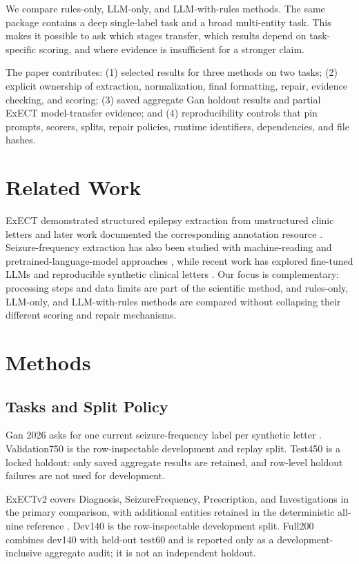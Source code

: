 \documentclass[conference]{IEEEtran}
\begin{document}
We compare rules-only, LLM-only, and LLM-with-rules methods. The same package
contains a deep single-label task and a broad
multi-entity task. This makes it possible to ask which stages transfer, which
results depend on task-specific scoring, and where evidence is insufficient for
a stronger claim.

The paper contributes: (1) selected results for three methods on two tasks;
(2) explicit ownership of extraction, normalization, final formatting, repair,
evidence checking, and scoring; (3) saved aggregate Gan holdout results and
partial ExECT model-transfer evidence; and (4) reproducibility controls that pin prompts,
scorers, splits, repair policies, runtime identifiers, dependencies, and
file hashes.

\section{Related Work}

ExECT demonstrated structured epilepsy extraction from unstructured clinic
letters and later work documented the corresponding annotation resource
\cite{fonferko2019exect,fonferko2024annotation}. Seizure-frequency extraction
has also been studied with machine-reading and pretrained-language-model
approaches \cite{xie2022seizure,abeysinghe2025leveraging}, while recent work
has explored fine-tuned LLMs and reproducible synthetic clinical letters
\cite{holgate2025fine,gan2026synthetic}. Our focus is complementary: processing
steps and data limits are part of the scientific method, and rules-only,
LLM-only, and LLM-with-rules methods are compared without collapsing their
different scoring and repair mechanisms.

\section{Methods}

\subsection{Tasks and Split Policy}

Gan 2026 asks for one current seizure-frequency label per synthetic letter
\cite{gan2026synthetic}. Validation750 is the row-inspectable development and
replay split. Test450 is a locked holdout: only saved aggregate results are
retained, and row-level holdout failures are not used for development.

ExECTv2 covers Diagnosis, SeizureFrequency, Prescription, and Investigations in
the primary comparison, with additional entities retained in the deterministic
all-nine reference \cite{fonferko2019exect,fonferko2024annotation}. Dev140 is
the row-inspectable development split. Full200 combines dev140 with held-out
test60 and is reported only as a development-inclusive aggregate audit; it is
not an independent holdout.
\end{document}
